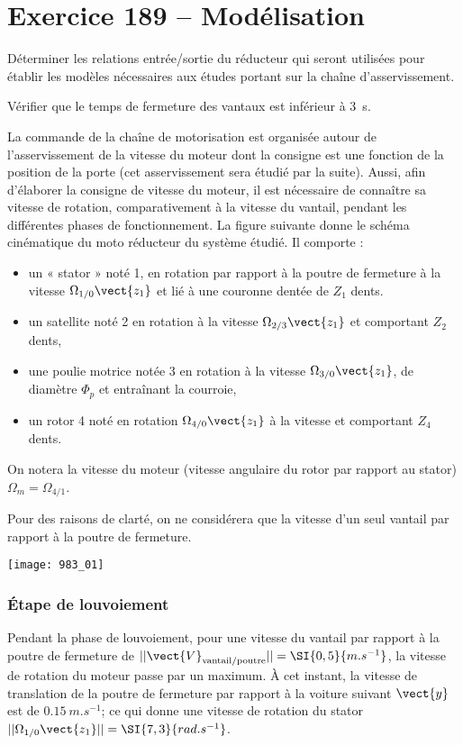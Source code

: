\section*{Exercice 189 -- Modélisation}
\setcounter{exo}{0}


\begin{obj}
Déterminer les relations entrée/sortie du réducteur qui seront utilisées pour établir les modèles nécessaires aux études portant sur la chaîne d’asservissement.

Vérifier que le temps de fermeture des vantaux est inférieur à \SI{3}{s}.
\end{obj}

La commande de la chaîne de motorisation est organisée autour de l’asservissement
de la vitesse du moteur dont la consigne est une fonction de la position de
la porte (cet asservissement sera étudié par la suite). Aussi, afin d’élaborer la
consigne de vitesse du moteur, il est nécessaire de connaître sa vitesse de rotation,
comparativement à la vitesse du vantail, pendant les différentes phases de
fonctionnement.
La figure suivante donne le schéma cinématique du moto réducteur du système étudié.
Il comporte :
\begin{itemize}
\item un « stator » noté 1, en rotation par rapport à la poutre de fermeture à la
vitesse $\Omega_{1/0}\vect{z_1}$ et lié à une couronne dentée de $Z_1$ dents.
\item un satellite noté 2 en rotation à la vitesse $\Omega_{2/3}\vect{z_1}$ et comportant $Z_2$ dents,
\item une poulie motrice notée 3 en rotation à la vitesse $\Omega_{3/0}\vect{z_1}$, de diamètre $\Phi_p$ et
entraînant la courroie,
\item un rotor 4 noté en rotation $\Omega_{4/0}\vect{z_1}$ à la vitesse et comportant $Z_4$ dents.
\end{itemize}

On notera la vitesse du moteur (vitesse angulaire du rotor par rapport au stator) $\Omega_{m}=\Omega_{4/1}$.

Pour des raisons de clarté, on ne considérera que la vitesse d’un seul vantail par
rapport à la poutre de fermeture.


\begin{center}
\texttt{[image: 983\_01]}%
\end{center}


\subsubsection*{Étape de louvoiement}
Pendant la phase de louvoiement, pour une vitesse du vantail par rapport à la
poutre de fermeture de $||\vect{V}_{\text{vantail}/\text{poutre}} || = \SI{0,5}{m.s^{-1}}$, la vitesse de rotation du
moteur passe par un maximum. À cet instant, la vitesse de translation de la
poutre de fermeture par rapport à la voiture suivant $\vect{y}$ est de $\SI{0,15}{m.s^{-1}}$; ce qui
donne une vitesse de rotation du stator $||\Omega_{1/0}\vect{z_1}||=\SI{7,3}{rad.s^{-1}}$.

